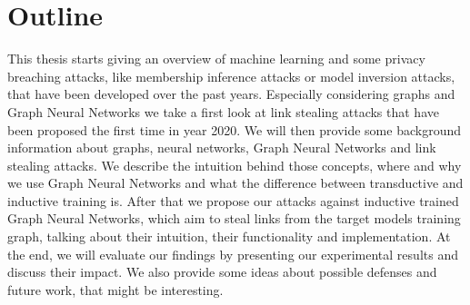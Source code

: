 	\section{Outline}
		This thesis starts giving an overview of machine learning and some privacy breaching attacks, like membership inference attacks or model inversion attacks, that have been developed over the past years.
		Especially considering graphs and Graph Neural Networks we take a first look at link stealing attacks that have been proposed the first time in year 2020.
		We will then provide some background information about graphs, neural networks, Graph Neural Networks and link stealing attacks.
		We describe the intuition behind those concepts, where and why we use Graph Neural Networks and what the difference between transductive and inductive training is.
		After that we propose our attacks against inductive trained Graph Neural Networks, which aim to steal links from the target models training graph, talking about their intuition, their functionality and implementation.
		At the end, we will evaluate our findings by presenting our experimental results and discuss their impact.
		We also provide some ideas about possible defenses and future work, that might be interesting.
